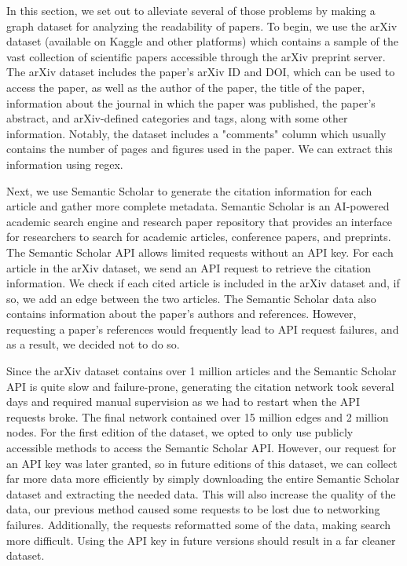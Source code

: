 \documentclass[final]{article}
\begin{document}
In this section, we set out to alleviate several of those problems by making a graph dataset for analyzing the readability of papers. To begin, we use the arXiv dataset (available on Kaggle and other platforms) which contains a sample of the vast collection of scientific papers accessible through the arXiv preprint server. \cite{arxiv} The arXiv dataset includes the paper's arXiv ID and DOI, which can be used to access the paper, as well as the author of the paper, the title of the paper, information about the journal in which the paper was published, the paper's abstract, and arXiv-defined categories and tags, along with some other information. Notably, the dataset includes a "comments" column which usually contains the number of pages and figures used in the paper. We can extract this information using regex.

Next, we use Semantic Scholar to generate the citation information for each article and gather more complete metadata. Semantic Scholar is an AI-powered academic search engine and research paper repository that provides an interface for researchers to search for academic articles, conference papers, and preprints. The Semantic Scholar API allows limited requests without an API key. For each article in the arXiv dataset, we send an API request to retrieve the citation information. We check if each cited article is included in the arXiv dataset and, if so, we add an edge between the two articles. The Semantic Scholar data also contains information about the paper's authors and references. However, requesting a paper's references would frequently lead to API request failures, and as a result, we decided not to do so. 

Since the arXiv dataset contains over 1 million articles and the Semantic Scholar API is quite slow and failure-prone, generating the citation network took several days and required manual supervision as we had to restart when the API requests broke. The final network contained over 15 million edges and 2 million nodes. For the first edition of the dataset, we opted to only use publicly accessible methods to access the Semantic Scholar API. However, our request for an API key was later granted, so in future editions of this dataset, we can collect far more data more efficiently by simply downloading the entire Semantic Scholar dataset and extracting the needed data. This will also increase the quality of the data, our previous method caused some requests to be lost due to networking failures. Additionally, the requests reformatted some of the data, making search more difficult. Using the API key in future versions should result in a far cleaner dataset. 
\end{document}
